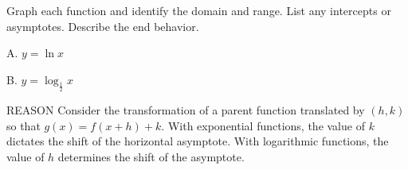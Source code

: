 \documentclass{article}
\newenvironment{concept-box}{}{}        %
\newenvironment{tryit}[1]{}{}           %
\newcommand{\answer}[1]{}               %
\begin{document}
\begin{tryit}{1}
Graph each function and identify the domain and range. List any intercepts or asymptotes. Describe the end behavior.

A. $y=\ln x$

B. $y=\log_{\frac12}x$

\answer{A. Domain: $\{x\mid x>0\}$; range: all real numbers; $x$-intercept: $1$; asymptote: $y$-axis; end behavior: As $x\to0$, $y\to -\infty$. As $x\to\infty$, $y\to\infty$.

\begin{tikzpicture}
\begin{axis}[width=6cm,height=5cm,axis lines=middle,xmin=0,xmax=5,ymin=-3,ymax=3,xtick={0,2,4},ytick={-2,0,2},xlabel={$x$},ylabel={$y$},grid=both]
\addplot[red,thick,domain=0.05:5,samples=100] {ln(x)};
\draw[dashed] (axis cs:0,-3)--(axis cs:0,3) node[pos=0.95,right] {$x=0$};
\end{axis}
\end{tikzpicture}

B. Domain: $\{x\mid x>0\}$; range: all real numbers; $x$-intercept: $1$; asymptote: $y$-axis; end behavior: As $x\to0$, $y\to\infty$. As $x\to\infty$, $y\to -\infty$.

\begin{tikzpicture}
\begin{axis}[width=6cm,height=5cm,axis lines=middle,xmin=0,xmax=5,ymin=-3,ymax=3,xtick={0,2,4},ytick={-2,0,2},xlabel={$x$},ylabel={$y$},grid=both]
\addplot[red,thick,domain=0.05:5,samples=100] {ln(x)/ln(0.5)};
\draw[dashed] (axis cs:0,-3)--(axis cs:0,3) node[pos=0.95,right] {$x=0$};
\end{axis}
\end{tikzpicture}}
\end{tryit}

\begin{concept-box}
REASON Consider the transformation of a parent function translated by $(h,k)$ so that $g(x)=f(x+h)+k$. With exponential functions, the value of $k$ dictates the shift of the horizontal asymptote. With logarithmic functions, the value of $h$ determines the shift of the asymptote.
\end{concept-box}
\end{document}
